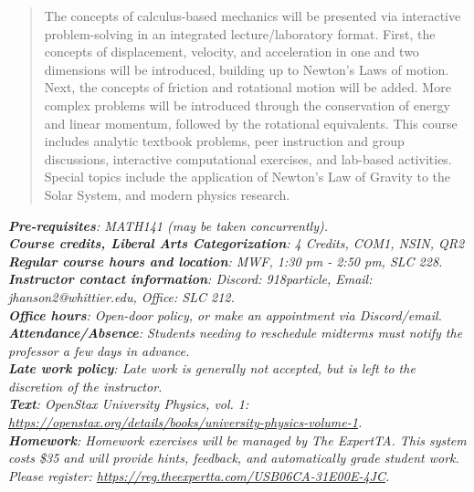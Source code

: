 \documentclass[10pt]{article}
\begin{document}
\maketitle

\begin{abstract}
The concepts of calculus-based mechanics will be presented via interactive problem-solving in an integrated lecture/laboratory format.  First, the concepts of displacement, velocity, and acceleration in one and two dimensions will be introduced, building up to Newton's Laws of motion.  Next, the concepts of friction and rotational motion will be added.  More complex problems will be introduced through the conservation of energy and linear momentum, followed by the rotational equivalents.  This course includes analytic textbook problems, peer instruction and group discussions, interactive computational exercises, and lab-based activities.  Special topics include the application of Newton's Law of Gravity to the Solar System, and modern physics research.
\end{abstract} \vspace{0.1cm}
\noindent
\textit{\textbf{Pre-requisites}: MATH141 (may be taken concurrently).} \\
\textit{\textbf{Course credits, Liberal Arts Categorization}: 4 Credits, COM1, NSIN, QR2} \\
\textit{\textbf{Regular course hours and location}: MWF, 1:30 pm - 2:50 pm, SLC 228.} \\
\textit{\textbf{Instructor contact information}: Discord: 918particle, Email: jhanson2@whittier.edu, Office: SLC 212.} \\
\textit{\textbf{Office hours}: Open-door policy, or make an appointment via Discord/email.} \\
\textit{\textbf{Attendance/Absence}: Students needing to reschedule midterms must notify the professor a few days in advance.} \\ 
\textit{\textbf{Late work policy}: Late work is generally not accepted, but is left to the discretion of the instructor.} \\
\textit{\textbf{Text}: OpenStax University Physics, vol. 1: \url{https://openstax.org/details/books/university-physics-volume-1}.} \\
\textit{\textbf{Homework}: Homework exercises will be managed by The ExpertTA.  This system costs \$35 and will provide hints, feedback, and automatically grade student work.  Please register: \url{https://reg.theexpertta.com/USB06CA-31E00E-4JC}.} \\
\end{document}
